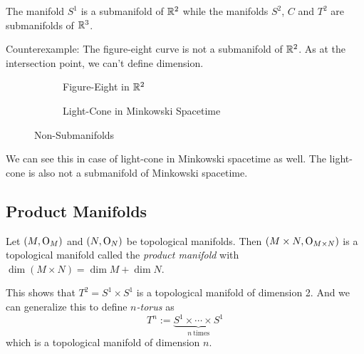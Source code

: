 \begin{example}
	The manifold \(S^1\) is a submanifold of \(\mathbb R^2\) while the manifolds \(S^2\), \(C\) and \(T^2\) are submanifolds of \(\mathbb R^3\).
\end{example}
Counterexample: The figure-eight curve is not a submanifold of \(\mathbb R^2\). As at the intersection point, we can't define dimension.

\begin{figure}[H]
	\centering
	\begin{subfigure}{0.4\textwidth}
		\centering
		\caption{Figure-Eight in \(\mathbb R^2\)}
		\label{fig:figure-eight}
	\end{subfigure}
	\begin{subfigure}{0.4\textwidth}
		\centering
		\caption{Light-Cone in Minkowski Spacetime}
		\label{fig:light-cone}
	\end{subfigure}
	\caption{Non-Submanifolds}
	\label{fig:non-submanifolds}
\end{figure}

We can see this in case of light-cone in Minkowski spacetime as well. The light-cone is also not a submanifold of Minkowski spacetime.

\subsection{Product Manifolds}

\begin{definition}
	Let \((M, \mathrm{O}_M)\) and \((N, \mathrm{O}_N)\) be topological manifolds. Then \((M \times N, \mathrm{O}_{M \times N})\) is a topological manifold called the \emph{product manifold} with \(\dim(M \times N) = \dim{M} + \dim{N}\).
\end{definition}

\begin{example}
	This shows that \(T^2 = S^1 \times S^1\) is a topological manifold of dimension 2. And we can generalize this to define \emph{\(n\)-torus} as
	\begin{equation}
		T^n := \underbrace{S^1 \times \cdots \times S^1}_{n\ \text{times}}
	\end{equation}
	which is a topological manifold of dimension \(n\).
\end{example}

